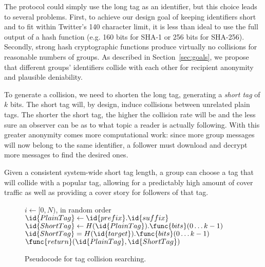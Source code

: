 The \hoot protocol could simply use the long tag as an identifier, but
this choice leads to several problems. First, to achieve our design goal
of keeping identifiers short and to fit within Twitter's 140 character
limit, it is less than ideal to use the full output of a hash function
(e.g. 160 bits for SHA-1 or 256 bits for SHA-256). Secondly, strong hash
cryptographic functions produce virtually no collisions for reasonable
numbers of groups. As described in Section~\ref{sec:goals}, we propose
that different groups' identifiers collide with each other for recipient
anonymity and plausible deniability.

To generate a collision, we need to shorten the long tag, generating a
\textit{short tag} of $k$ bits. The short tag will, by design, induce
collisions between unrelated plain tags. The shorter the short tag, the
higher the collision rate will be and the less sure an observer can be
as to what topic a \hoot reader is actually following. With this greater
anonymity comes more computational work: since more group messages will
now belong to the same identifier, a follower must download and decrypt
more messages to find the desired ones.

Given a consistent system-wide short tag length, a group can choose a
tag that will collide with a popular tag, allowing for a predictably
high amount of cover traffic as well as providing a cover story for
followers of that tag.
%
\begin{figure}
\begin{codebox}
\zi \For $i \gets [0,N)$, in random order
\zi \Do
\zi $\id{PlainTag} \gets  \id{prefix}.\id{suffix}$
\zi $\id{ShortTag} \gets H(\id{PlainTag}).\func{bits}(0 \ldots k-1)$
\zi \If $\id{ShortTag} = H(\id{target}).\func{bits}(0 \ldots k-1)$
\zi \Then $\func{return} (\id{PlainTag} , \id{ShortTag})$
\zi \End
\End
\end{codebox}
\caption{Pseudocode for tag collision searching.\label{fig:find-tag}}
\end{figure}

